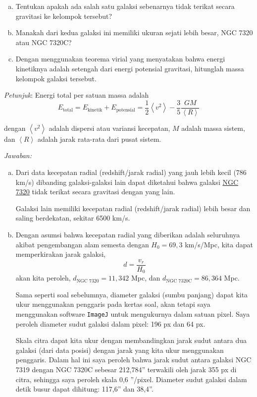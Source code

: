 \documentclass[11pt,fleqn]{exam}
\newcommand*{\as}{''}
\begin{document}
\begin{questions}
\begin{enumerate}[a.]
	\item Tentukan apakah ada salah satu galaksi sebenarnya tidak terikat secara gravitasi ke kelompok tersebut?
	\item Manakah dari kedua galaksi ini memiliki ukuran sejati lebih besar, NGC 7320 atau NGC 7320C?
	\item Dengan menggunakan teorema virial yang menyatakan bahwa energi kinetiknya adalah setengah dari energi potensial gravitasi, hitunglah massa kelompok galaksi tersebut.
\end{enumerate}
\textit{Petunjuk}: Energi total per satuan massa adalah
$$E_{\text{total}} = E_{\text{kinetik}} + E_{\text{potensial}} = \frac{1}{2} \left< v^2 \right> - \frac{3}{5}\frac{GM}{\left< R \right>}$$

dengan $\left< v^2 \right>$  adalah dispersi atau variansi kecepatan, $M$ adalah massa sistem, dan $\left< R \right>$ adalah jarak rata-rata dari pusat sistem.


\textit{Jawaban: }

\begin{enumerate}[a.]
	\item Dari data kecepatan radial (redshift/jarak radial) yang jauh lebih kecil (786 km/s) dibanding galaksi-galaksi lain dapat diketahui bahwa galaksi \underline{NGC 7320} tidak terikat secara gravitasi dengan yang lain. 
	
	Galaksi lain memiliki kecepatan radial (redshift/jarak radial) lebih besar dan saling berdekatan, sekitar 6500 km/s. 
	
	\item Dengan asumsi bahwa kecepatan radial yang diberikan adalah seluruhnya akibat pengembangan alam semesta dengan $H_0 = 69,3$ km/s/Mpc, kita dapat memperkirakan jarak galaksi,
	\begin{equation*}
	d = \frac{v_r}{H_0}
	\end{equation*}
	akan kita peroleh, $d_\text{NGC 7320} = 11,342$ Mpc, dan $d_\text{NGC 7320C} = 86,364$ Mpc.
	
	Sama seperti soal sebelumnya, diameter galaksi (sumbu panjang) dapat kita ukur menggunakan penggaris pada kertas soal, akan tetapi saya menggunakan software \texttt{ImageJ} untuk mengukurnya dalam satuan pixel. Saya peroleh diameter sudut galaksi dalam pixel: 196 px dan 64 px.
	
	Skala citra dapat kita ukur dengan membandingkan jarak sudut antara dua galaksi (dari data posisi) dengan jarak yang kita ukur menggunakan penggaris. Dalam hal ini saya peroleh bahwa jarak sudut antara galaksi NGC 7319 dengan NGC 7320C sebesar 212,784\as{} terwakili oleh jarak 355 px di citra, sehingga saya peroleh skala 0,6 \as/pixel. Diameter sudut galaksi dalam detik busur dapat dihitung: 117,6\as{} dan 38,4\as{}.
	

\end{enumerate}
\end{questions}
\end{document}
